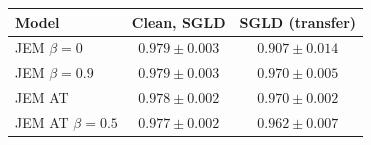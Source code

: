 \begin{tabular}{lcc}
\toprule
Model & Clean, SGLD & SGLD (transfer) \\
\midrule
JEM $\beta=0$ & $0.979 \pm 0.003$ & $0.907 \pm 0.014$ \\
JEM $\beta=0.9$ & $0.979 \pm 0.003$ & $0.970 \pm 0.005$ \\
JEM AT & $0.978 \pm 0.002$ & $\mathbf{0.970 \pm 0.002}$ \\
JEM AT $\beta=0.5$ & $0.977 \pm 0.002$ & $0.962 \pm 0.007$ \\
\bottomrule
\end{tabular}
